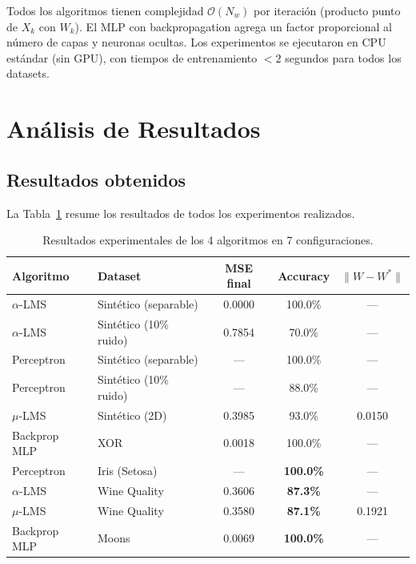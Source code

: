 \documentclass[12pt,a4paper]{article}
\newcommand{\norm}[1]{\lVert#1\rVert}
\begin{document}
Todos los algoritmos tienen complejidad $\mathcal{O}(N_w)$ por iteración (producto punto de $X_k$ con $W_k$). El MLP con backpropagation agrega un factor proporcional al número de capas y neuronas ocultas. Los experimentos se ejecutaron en CPU estándar (sin GPU), con tiempos de entrenamiento $< 2$ segundos para todos los datasets.

\section{Análisis de Resultados}

\subsection{Resultados obtenidos}

La Tabla~\ref{tab:resultados} resume los resultados de todos los experimentos realizados.

\begin{table}[H]
\centering
\begin{tabular}{@{}llccc@{}}
\toprule
\textbf{Algoritmo} & \textbf{Dataset} & \textbf{MSE final} & \textbf{Accuracy} & $\norm{W - W^*}$ \\
\midrule
$\alpha$-LMS & Sintético (separable) & 0.0000 & 100.0\% & --- \\
$\alpha$-LMS & Sintético (10\% ruido) & 0.7854 & 70.0\% & --- \\
Perceptron & Sintético (separable) & --- & 100.0\% & --- \\
Perceptron & Sintético (10\% ruido) & --- & 88.0\% & --- \\
$\mu$-LMS & Sintético (2D) & 0.3985 & 93.0\% & 0.0150 \\
Backprop MLP & XOR & 0.0018 & 100.0\% & --- \\
\midrule
Perceptron & Iris (Setosa) & --- & \textbf{100.0\%} & --- \\
$\alpha$-LMS & Wine Quality & 0.3606 & \textbf{87.3\%} & --- \\
$\mu$-LMS & Wine Quality & 0.3580 & \textbf{87.1\%} & 0.1921 \\
Backprop MLP & Moons & 0.0069 & \textbf{100.0\%} & --- \\
\bottomrule
\end{tabular}
\caption{Resultados experimentales de los 4 algoritmos en 7 configuraciones.}
\label{tab:resultados}
\end{table}
\end{document}
